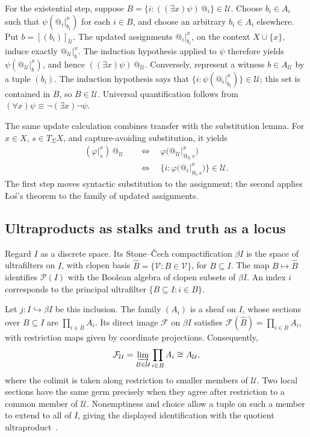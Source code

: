 \documentclass[11pt]{article}
\makeatletter
\newcommand{\atsign}{\mathord{@}}
\makeatother
\begin{document}
For the existential step, suppose
\(B=\{i:((\exists x)\psi)\,\atsign_i\}\in\mathcal U\).
Choose \(b_i\in A_i\) such that
\(\psi(\atsign_i\vert_{b_i}^{x})\) for each \(i\in B\), and choose an
arbitrary \(b_i\in A_i\) elsewhere. Put \(b=[(b_i)]_{\mathcal U}\).
The updated assignments \(\atsign_i\vert_{b_i}^{x}\), on the context
\(X\cup\{x\}\), induce exactly
\(\atsign_{\mathcal U}\vert_b^{x}\). The induction hypothesis applied to
\(\psi\) therefore yields
\(\psi(\atsign_{\mathcal U}\vert_b^{x})\), and hence
\(((\exists x)\psi)\,\atsign_{\mathcal U}\).
Conversely, represent a witness \(b\in A_{\mathcal U}\) by a tuple
\((b_i)\). The induction hypothesis says that
\(\{i:\psi(\atsign_i\vert_{b_i}^{x})\}\in\mathcal U\); this set is
contained in \(B\), so \(B\in\mathcal U\).
Universal quantification follows from
\((\forall x)\psi\equiv\neg(\exists x)\neg\psi\).

The same update calculation combines transfer with the substitution
lemma. For \(x\in X\), \(s\in T_\Sigma X\), and capture-avoiding
substitution, it yields
\[
\begin{aligned}
(\varphi\vert_s^x)\,\atsign_{\mathcal U}
&\quad\Longleftrightarrow\quad
\varphi\bigl(\atsign_{\mathcal U}
                  \vert_{\atsign_{\mathcal U}\,s}^{x}\bigr)\\
&\quad\Longleftrightarrow\quad
\bigl\{i:\varphi\bigl(\atsign_i\vert_{\atsign_i\,s}^{x}\bigr)\bigr\}
\in\mathcal U.
\end{aligned}
\]
The first step moves syntactic substitution to the assignment; the second
applies \L{}o\'s's theorem to the family of updated assignments.

\subsection{Ultraproducts as stalks and truth as a locus}

Regard \(I\) as a discrete space. Its Stone--\v{C}ech compactification
\(\beta I\) is the space of ultrafilters on \(I\), with clopen basis
\(\widehat B=\{\mathcal V:B\in\mathcal V\}\), for \(B\subseteq I\).
The map \(B\mapsto\widehat B\) identifies \(\mathcal P(I)\) with the
Boolean algebra of clopen subsets of \(\beta I\).
An index \(i\) corresponds to the principal ultrafilter
\(\{B\subseteq I:i\in B\}\).

Let \(j:I\hookrightarrow\beta I\) be this inclusion.
The family \((A_i)\) is a sheaf on \(I\), whose sections over
\(B\subseteq I\) are \(\prod_{i\in B}A_i\).
Its direct image \(\mathcal F\) on \(\beta I\) satisfies
\(\mathcal F(\widehat B)=\prod_{i\in B}A_i\), with restriction maps
given by coordinate projections. Consequently,
\[
\mathcal F_{\mathcal U}
=\varinjlim_{B\in\mathcal U}\prod_{i\in B}A_i
\cong A_{\mathcal U},
\]
where the colimit is taken along restriction to smaller members of
\(\mathcal U\). Two local sections have the same germ precisely when
they agree after restriction to a common member of \(\mathcal U\).
Nonemptiness and choice allow a tuple on such a member to extend to
all of \(I\), giving the displayed identification with the quotient
ultraproduct~\cite[Example~14]{LurieUltraproducts}.
\end{document}

